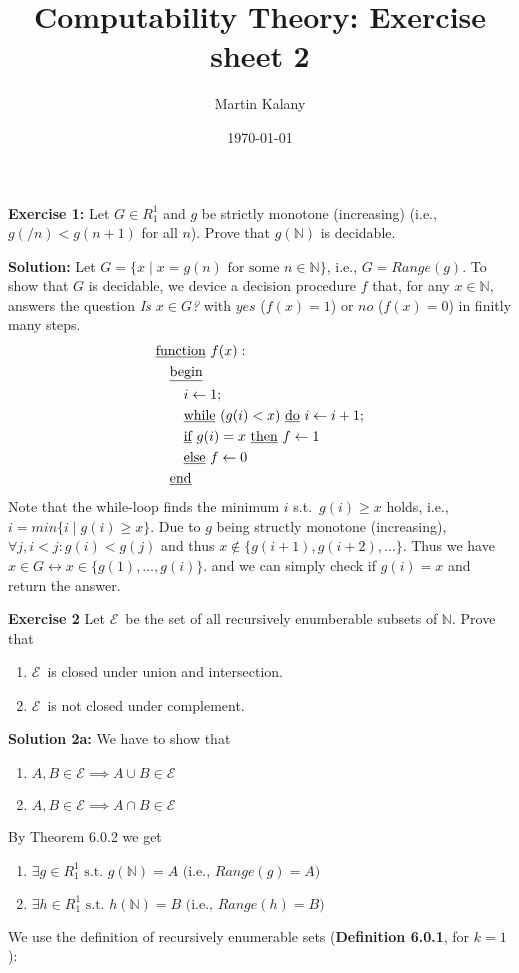 \documentclass [11pt]{article}
\title{Computability Theory: Exercise sheet 2}
\author{Martin Kalany}
\date{\today}
\newcommand{\E}{\ensuremath{\mathcal{E}}}
\newcommand{\N}{\ensuremath{\mathbb{N}}}
\newcommand{\lra}{\ensuremath{\leftrightarrow}}
\begin{document}
\maketitle

\bigskip
\noindent
\textbf{Exercise 1:} Let $G \in R^1_1$ and $g$ be strictly monotone (increasing) (i.e., $g(/n) < g(n+1)$ for all $n$). Prove that $g(\N)$ is decidable.

\noindent
\textbf{Solution:} Let $G = \{x \mid x = g(n) \text{ for some } n\in \N\}$, i.e., $G = Range(g)$.
To show that $G$ is decidable, we device a decision procedure $f$ that, for any $x\in \N$, answers the question \emph{Is $x \in G$?} with $yes$ ($f(x) = 1$) or $no$ ($f(x) = 0$) in finitly many steps.
\begin{align*}
& \text{\underline{function} } f(x): \\
& \quad \text{\underline{begin}} \\
& \quad \quad i \leftarrow 1; \\
& \quad \quad \text{\underline{while} } (g(i) < x) \text{ \underline{do} } i \leftarrow i +1; \\
& \quad \quad \text{\underline{if} } g(i) = x \text{ \underline{then} } f \leftarrow 1\\
& \quad \quad \text{\underline{else} } f \leftarrow 0\\
& \quad \text{\underline{end}}
\end{align*}
Note that the while-loop finds the minimum $i$ s.t.\ $g(i) \geq x$ holds, i.e., $i= min\{i \mid g(i) \geq x\}$. 
Due to $g$ being structly monotone (increasing), $\forall j, i < j: g(i) < g(j)$ and thus $x\not \in \{g(i+1), g(i+2),\dots\}$.
Thus we have $x\in G \lra x \in \{g(1),\dots,g(i)\}$. and we can simply check if $g(i) = x$ and return the answer.

\bigskip
\noindent
\textbf{Exercise 2}  Let \E\ be the set of all recursively enumberable subsets of \N. Prove that 
\begin{enumerate}[label={\alph*)}] 
 \item \E\ is closed under union and intersection.
 \item \E\ is not closed under complement.
\end{enumerate}
\textbf{Solution 2a:}
We have to show that
\begin{enumerate}[label={\alph*)}] 
 \item $A, B \in \E \implies A\cup B \in \E$ 
 \item $A, B \in \E \implies A\cap B \in \E$ 
\end{enumerate}
By Theorem 6.0.2 we get 
\begin{enumerate}[label={\alph*)}] 
 \item $\exists g \in R_1^1 \text{ s.t.\ } g(\N) = A \text{ (i.e., } Range(g) = A)$
 \item $\exists h \in R_1^1 \text{ s.t.\ } h(\N) = B\text{ (i.e., } Range(h) = B)$
\end{enumerate}
We use the definition of recursively enumerable sets (\textbf{Definition 6.0.1}, for $k=1$):
\end{document}
